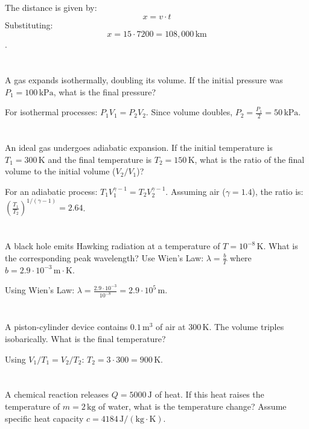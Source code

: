 \documentclass{article}
\begin{document}
The distance is given by: \[ x = v \cdot t \] Substituting: \[ x = 15 \cdot 7200 = 108,000 \, \mathrm{km} \].

\section{}
A gas expands isothermally, doubling its volume. If the initial pressure was \( P_1 = 100 \, \mathrm{kPa} \), what is the final pressure?

For isothermal processes: \( P_1 V_1 = P_2 V_2 \). Since volume doubles, \( P_2 = \frac{P_1}{2} = 50 \, \mathrm{kPa} \).

\section{}
An ideal gas undergoes adiabatic expansion. If the initial temperature is \( T_1 = 300 \, \mathrm{K} \) and the final temperature is \( T_2 = 150 \, \mathrm{K} \), what is the ratio of the final volume to the initial volume (\( V_2 / V_1 \))?

For an adiabatic process: \( T_1 V_1^{\gamma-1} = T_2 V_2^{\gamma-1} \). Assuming air (\( \gamma = 1.4 \)), the ratio is: \( \left(\frac{T_1}{T_2} \right)^{1/(\gamma-1)} = 2.64 \).

\section{}
A black hole emits Hawking radiation at a temperature of \( T = 10^{-8} \, \mathrm{K} \). What is the corresponding peak wavelength? Use Wien's Law: \( \lambda = \frac{b}{T} \) where \( b = 2.9 \cdot 10^{-3} \, \mathrm{m \cdot K} \).

Using Wien's Law: \( \lambda = \frac{2.9 \cdot 10^{-3}}{10^{-8}} = 2.9 \cdot 10^{5} \, \mathrm{m} \).

\section{}
A piston-cylinder device contains \( 0.1 \, \mathrm{m^3} \) of air at \( 300 \, \mathrm{K} \). The volume triples isobarically. What is the final temperature?

Using \( V_1 / T_1 = V_2 / T_2 \): \( T_2 = 3 \cdot 300 = 900 \, \mathrm{K} \).

\section{}
A chemical reaction releases \( Q = 5000 \, \mathrm{J} \) of heat. If this heat raises the temperature of \( m = 2 \, \mathrm{kg} \) of water, what is the temperature change? Assume specific heat capacity \( c = 4184 \, \mathrm{J/(kg \cdot K)} \).
\end{document}
